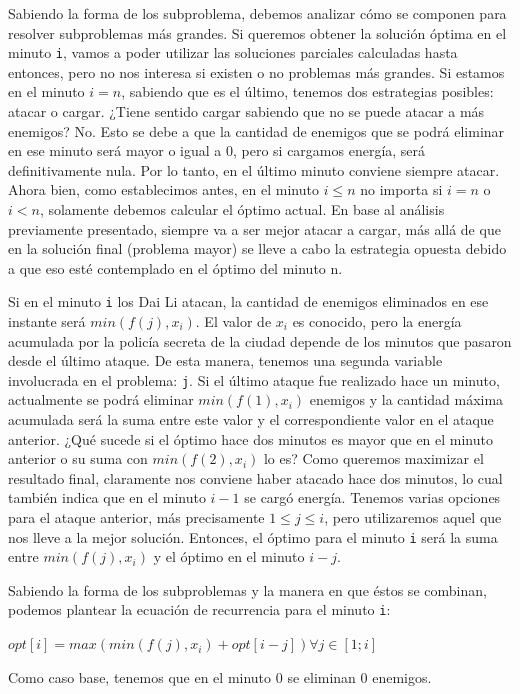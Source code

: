 \documentclass{article}
\begin{document}
Sabiendo la forma de los subproblema, debemos analizar cómo se componen para resolver subproblemas más grandes. Si queremos obtener la solución óptima en el minuto \texttt{i}, vamos a poder utilizar las soluciones parciales calculadas hasta entonces, pero no nos interesa si existen o no problemas más grandes. Si estamos en el minuto $i = n$, sabiendo que es el último, tenemos dos estrategias posibles: atacar o cargar. ¿Tiene sentido cargar sabiendo que no se puede atacar a más enemigos? No. Esto se debe a que la cantidad de enemigos que se podrá eliminar en ese minuto será  mayor o igual a 0, pero si cargamos energía, será definitivamente nula. Por lo tanto, en el último minuto conviene siempre atacar. Ahora bien, como establecimos antes, en el minuto $i \leq n$ no importa si $i = n$ o $i < n$, solamente debemos calcular el óptimo actual. En base al análisis previamente presentado, siempre va a ser mejor atacar a cargar, más allá de que en la solución final (problema mayor) se lleve a cabo la estrategia opuesta debido a que eso esté contemplado en el óptimo del minuto n. 

Si en el minuto \texttt{i} los Dai Li atacan, la cantidad de enemigos eliminados en ese instante será $min(f(j), x_i)$. El valor de $x_i$ es conocido, pero la energía acumulada por la policía secreta de la ciudad depende de los minutos que pasaron desde el último ataque. De esta manera, tenemos una segunda variable involucrada en el problema: \texttt{j}. Si el último ataque fue realizado hace un minuto, actualmente se podrá eliminar $min(f(1), x_i)$ enemigos y la cantidad máxima acumulada será la suma entre este valor y el correspondiente valor en el ataque anterior. ¿Qué sucede si el óptimo hace dos minutos es mayor que en el minuto anterior o su suma con $min(f(2), x_i)$ lo es? Como queremos maximizar el resultado final, claramente nos conviene haber atacado hace dos minutos, lo cual también indica que en el minuto $i - 1$ se cargó energía. Tenemos varias opciones para el ataque anterior, más precisamente $1 \leq j \leq i$, pero utilizaremos aquel que nos lleve a la mejor solución. Entonces, el óptimo para el minuto \texttt{i} será la suma entre $min(f(j), x_i)$ y el óptimo en el minuto $i - j$.

Sabiendo la forma de los subproblemas y la manera en que éstos se combinan, podemos plantear la ecuación de recurrencia para el minuto \texttt{i}:

$
opt[i] = max(min(f(j), x_i) + opt[i - j]) \forall j \in [1; i]
$

Como caso base, tenemos que en el minuto 0 se eliminan 0 enemigos.
\end{document}
